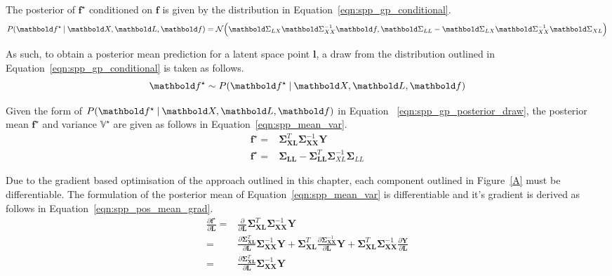The posterior of \( \bm{f}^{\star} \) conditioned on \( \bm{f} \) is given by
the distribution in Equation~\ref{eqn:spp_gp_conditional}.
\begin{equation}
  \label{eqn:spp_gp_conditional}
  P(\bm{f}^{\star} \given \bm{X}, \bm{L}, \bm{f}) = 
  \mathcal{N} \Big(
    \bm{\Sigma}_{LX} \bm{\Sigma}_{XX}^{-1} \bm{f}, 
    \bm{\Sigma}_{LL} - \bm{\Sigma}_{LX} \bm{\Sigma}_{XX}^{-1} \bm{\Sigma}_{XL}
  \Big) 
\end{equation}

As such, to obtain a posterior mean prediction for a latent space point \( \bm{l} \), 
a draw from the distribution outlined in Equation~\ref{eqn:spp_gp_conditional} is 
taken as follows.
\begin{equation}
  \label{eqn:spp_gp_posterior_draw}
  \bm{f}^{\star} \sim P(\bm{f}^{\star} \given \bm{X}, \bm{L}, \bm{f})
\end{equation}

Given the form of \( P(\bm{f}^{\star} \given \bm{X}, \bm{L}, \bm{f}) \) in Equation
~\ref{eqn:spp_gp_posterior_draw}, the posterior mean \( \bm{f}^{\star} \) and variance
\( \mathbb{V}^{\star} \) are given as follows in Equation~\ref{eqn:spp_mean_var}.
\begin{align}
  \label{eqn:spp_mean_var}
  \bm{f}^{\star} ={}& 
  \bm{\Sigma}_{\bm{XL}}^{T} \bm{\Sigma}_{\bm{XX}}^{-1} \bm{Y}\\
  \mathbb{\bm{f}^{\star}} ={}&
  \bm{\Sigma}_{\bm{LL}} - \bm{\Sigma}_{\bm{LL}}^{T} \bm{\Sigma}_{XL}^{-1} \bm{\Sigma}_{LL}
\end{align}

Due to the gradient based optimisation of the approach outlined in this chapter, each 
component outlined in Figure~\ref{A} must be differentiable. The formulation of the 
posterior mean of Equation~\ref{eqn:spp_mean_var} is differentiable and it's gradient 
is derived as follows in Equation~\ref{eqn:spp_pos_mean_grad}.
\begin{align}
  \label{eqn:spp_pos_mean_grad}
  \frac{\partial \bm{f}^{\star}}{\partial \bm{L}} ={}&
  \frac{\partial}{\partial \bm{L}}
  \bm{\Sigma}_{\bm{XL}}^{T} \bm{\Sigma}_{\bm{XX}}^{-1} \bm{Y}\\
  ={}& \frac{\partial \bm{\Sigma}_{\bm{XL}}^{T}}{\partial \bm{L}}
  \bm{\Sigma}_{\bm{XX}}^{-1} \bm{Y}
  + \bm{\Sigma}_{\bm{XL}}^{T} 
  \frac{\partial\bm{\Sigma}_{\bm{XX}}^{-1}}{\partial \bm{L}} \bm{Y}
  + \bm{\Sigma}_{\bm{XL}}^{T} \bm{\Sigma}_{\bm{XX}}^{-1} 
  \frac{\partial \bm{Y}}{\partial \bm{L}}\\
  ={}& \frac{\partial \bm{\Sigma}_{\bm{XL}}^{T}}{\partial \bm{L}}
  \bm{\Sigma}_{\bm{XX}}^{-1} \bm{Y}
\end{align}

